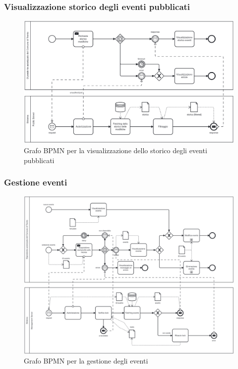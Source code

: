 \documentclass{article}
\begin{document}
\subsubsection{Visualizzazione storico degli eventi pubblicati}

\begin{figure}[htbp]
    \label{7.2.2}
    \centering
    \includegraphics[width=1\textwidth]{Images/BPMN - storico.png}
    \caption{Grafo BPMN per la visualizzazione dello storico degli eventi pubblicati}
\end{figure}
\clearpage

\subsubsection{Gestione eventi}

\begin{figure}[htbp]
    \label{7.2.3}
    \centering
    \includegraphics[width=1\textwidth]{Images/BPMN - gestione_evento.png}
    \caption{Grafo BPMN per la gestione degli eventi}
\end{figure}
\end{document}
